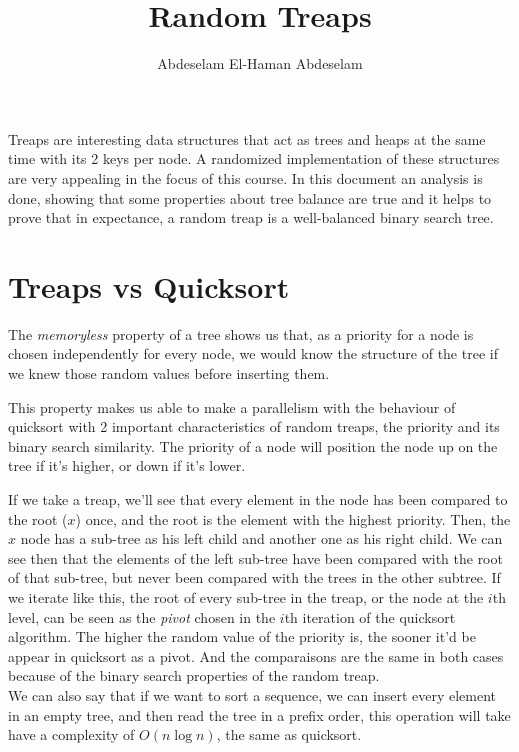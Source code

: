 \documentclass[a4paper,10pt]{article}
\title{Random Treaps}
\author{Abdeselam El-Haman Abdeselam}
\begin{document}
\sloppy
\maketitle

Treaps are interesting data structures that act as trees and heaps at the same time
with its 2 keys per node. A randomized implementation of these structures are very appealing
in the focus of this course. In this document an analysis is done, showing that some properties
about tree balance are true and it helps to prove that in expectance, a random treap
is a well-balanced binary search tree.

\section{Treaps vs Quicksort}

The \textit{memoryless} property of a tree shows us that, as a priority for a node is chosen
independently for every node, we would know the structure of the tree if we knew those
random values before inserting them.

This property makes us able to make a parallelism with the behaviour of quicksort with 2
important characteristics of random treaps, the priority and its binary search similarity.
The priority of a node will position the node
up on the tree if it's higher, or down if it's lower.

If we take a treap, we'll see that every element in the node has been compared to the root ($x$) once,
and the root is the element with the highest priority. Then, the $x$ node has a sub-tree as his
left child and another one as his right child. We can see then that the elements of the left sub-tree
have been compared with the root of that sub-tree, but never been compared with the trees in the other
subtree. If we iterate like this, the root of every sub-tree in the treap, or the node at the $i$th level, can be seen as the \textit{pivot} chosen in the $i$th iteration of the quicksort algorithm. The
higher the random value of the priority is, the sooner it'd be appear in quicksort as a pivot. And the
comparaisons are the same in both cases because of the binary search properties of the random treap. \\

We can also say that if we want to sort a sequence, we can insert every element in an empty tree, and then read the tree in a prefix order, this operation will take have a complexity of $O(n\log n)$, the same as quicksort.
\end{document}
